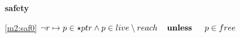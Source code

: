 \textbf{safety}
\begin{block}
\item[ \eqref{m2:saf0} ]{$\neg r \mapsto p \in \star ptr  %
			\land p \in live \setminus reach  \textbf{\quad unless \quad} p \in free $} %
\end{block}
